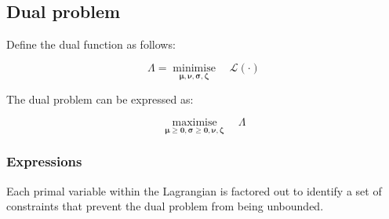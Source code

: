 \documentclass{article}
\newcommand{\sStorage}{G^{\mathrm{Q}}}
\newcommand{\sYears}{Y}
\newcommand{\sScenarios}{S}
\newcommand{\sIntervals}{T}
\newcommand{\sZones}{Z}
\newcommand{\iGenerator}{g}
\newcommand{\iYear}{y}
\newcommand{\iScenario}{s}
\newcommand{\iInterval}{t}
\newcommand{\iIntervalStart}{\underline{\iInterval}}
\newcommand{\iZone}{z}
\newcommand{\cPowerOutInitial}[1][\iGenerator,\iYear,\iScenario]{\hat{P}_{#1}^{\mathrm{out}}}
\newcommand{\cLostLoadPowerInitial}[1][\iZone,\iYear,\iScenario]{P_{#1}^{\mathrm{V}}}
\newcommand{\vEnergy}[1][\iGenerator,\iYear,\iScenario,\iInterval]{e_{#1}}
\newcommand{\vPowerOut}[1][\iGenerator,\iYear,\iScenario,\iInterval]{p^{\mathrm{out}}_{#1}}
\newcommand{\vLostLoadEnergy}[1][\iZone,\iYear,\iScenario,\iInterval]{e^{\mathrm{V}}_{#1}}
\newcommand{\vLostLoadPower}[1][\iZone,\iYear,\iScenario,\iInterval]{p^{\mathrm{V}}_{#1}}
\newcommand{\dStorageEnergyOutput}[1][\iGenerator,\iYear,\iScenario,\iInterval]{\zeta_{#1}^{3}}
\newcommand{\dLostLoadEnergy}[1][\iZone,\iYear,\iScenario,\iInterval]{\zeta_{#1}^{4}}
\DeclareMathOperator*{\minimise}{minimise}
\DeclareMathOperator*{\maximise}{maximise}
\begin{document}
\begin{align}
\begin{split}
	\end{split}
\end{align}

\subsection{Dual problem}
Define the dual function as follows:

\begin{equation}
	\Lambda = \minimise\limits_{\bm{\mu}, \bm{\nu}, \bm{\sigma}, \bm{\zeta}} \quad \mathcal{L}(\cdot)
\end{equation}

The dual problem can be expressed as:

\begin{equation}
	\maximise\limits_{\bm{\mu}\geq \bm{0}, \bm{\sigma}\geq \bm{0}, \bm{\nu}, \bm{\zeta}} \quad \Lambda
\end{equation}

\subsubsection{Expressions}
Each primal variable within the Lagrangian is factored out to identify a set of constraints that prevent the dual problem from being unbounded.

\newcommand{\sumIntervals}{\sum\limits_{\iYear \in \sYears}\sum\limits_{\iScenario \in \sScenarios} \sum\limits_{\iInterval \in \sIntervals}}
\end{document}
